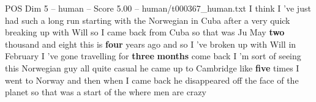 \begin{textsample}{POS Dim 5 – human – Score 5.00 – human/t000367\_human.txt}  \label{ex:f5_pos_005}
I think I 've just had such a long run starting with the Norwegian in Cuba after a very quick breaking up with Will so I came back from Cuba so that was Ju May \textbf{two} thousand and eight this is \textbf{four} years ago and so I 've broken up with Will in February I 've gone travelling for \textbf{three} \textbf{months} come back I 'm sort of seeing this Norwegian guy all quite casual he came up to Cambridge like \textbf{five} times I went to Norway and then when I came back he disappeared off the face of the planet so that was a start of the where men are crazy

\end{textsample}
